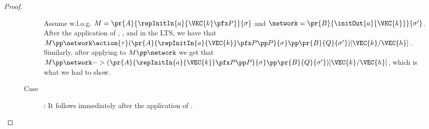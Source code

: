 \begin{proposition}
\begin{proof}
\begin{description}
\begin{description}
         Assume w.l.o.g. $M = \pr{A}{\repInitIn{a}{\VEC{k} \pfx P
           }}{\sigma}$ and $\network =
         \pr{B}{\initOut{a}{\VEC{k}}}{\sigma'}$. After the application
         of , ,  and
          in the LTS, we have that $M \pp \network
         \action{\tau} ( \pr{A}{ \repInitIn{a}{\VEC{k}} \pfx P \pp
             P}{\sigma} \pp
           \pr{B}{Q}{\sigma'})[\VEC{k}/\VEC{h}]$. Similarly, after  applying
            to $M \pp \network$ we get that $M \pp
           \network -> ( \pr{A}{ \repInitIn{a}{\VEC{k}} \pfx P \pp
             P}{\sigma} \pp  \pr{B}{Q}{\sigma'})[\VEC{k}/\VEC{h}]$, which is what we had to
           show.

           \item[Case \Did{E-Sum}]: It follows immediately after the
             application of .
   \end{description}

\end{description}
\end{proof}
\end{proposition}








